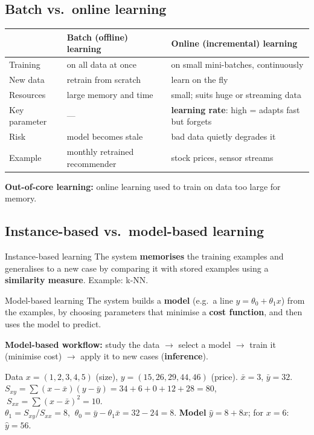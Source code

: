 \subsection{Batch vs.\ online learning}
\begin{center}
\small
\begin{tabular}{@{}p{2.8cm}p{6.6cm}p{6.6cm}@{}}
\toprule
 & \textbf{Batch (offline) learning} & \textbf{Online (incremental) learning}\\
\midrule
Training & on all data at once & on small mini-batches, continuously\\
New data & retrain from scratch & learn on the fly\\
Resources & large memory and time & small; suits huge or streaming data\\
Key parameter & --- & \textbf{learning rate}: high = adapts fast but forgets\\
Risk & model becomes stale & bad data quietly degrades it\\
Example & monthly retrained recommender & stock prices, sensor streams\\
\bottomrule
\end{tabular}
\end{center}
\textbf{Out-of-core learning:} online learning used to train on data too large for memory.

\subsection{Instance-based vs.\ model-based learning}
\begin{dfn}{Instance-based learning}
The system \textbf{memorises} the training examples and generalises to a new case by comparing it with stored examples using a \textbf{similarity measure}. Example: k-NN.
\end{dfn}
\begin{dfn}{Model-based learning}
The system builds a \textbf{model} (e.g.\ a line $\hat y=\theta_0+\theta_1x$) from the examples, by choosing parameters that minimise a \textbf{cost function}, and then uses the model to predict.
\end{dfn}
\textbf{Model-based workflow:} study the data $\to$ select a model $\to$ train it (minimise cost) $\to$ apply it to new cases (\textbf{inference}).

\begin{numer}
Data $x=(1,2,3,4,5)$ (size), $y=(15,26,29,44,46)$ (price). $\bar x=3$, $\bar y=32$.\\
$S_{xy}=\sum(x-\bar x)(y-\bar y)=34+6+0+12+28=80$, $\ S_{xx}=\sum(x-\bar x)^2=10$.\\
$\theta_1=S_{xy}/S_{xx}=8$, $\ \theta_0=\bar y-\theta_1\bar x=32-24=8$. \textbf{Model} $\hat y=8+8x$; for $x=6$: $\hat y=56$.
\end{numer}

